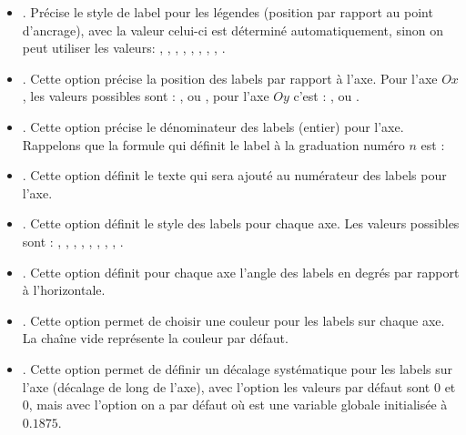 \begin{itemize}
\begin{itemize}
            \item {}. Précise le style de label pour les légendes (position par rapport au point d'ancrage), avec la valeur  celui-ci est déterminé automatiquement, sinon on peut utiliser les valeurs: , , , , , , , , .
            
            \item {}. Cette option précise la position des labels par rapport à l'axe. Pour l'axe $Ox$, les valeurs possibles sont : ,  ou , pour l'axe $Oy$ c'est :  ,  ou .
            
            \item {}. Cette option précise le dénominateur des labels (entier) pour l'axe. Rappelons que la formule qui définit le label à la graduation numéro $n$ est : 
            
            \item {}. Cette option définit le texte qui sera ajouté au numérateur des labels pour l'axe.
            
            \item {}. Cette option définit le style des labels pour chaque axe. Les valeurs possibles sont : , , , , , , , , .
            
            \item {}. Cette option définit pour chaque axe l'angle des labels en degrés par rapport à l'horizontale.
            
            \item {}. Cette option permet de choisir une couleur pour les labels sur chaque axe. La chaîne vide représente la couleur par défaut.
            
            \item {}. Cette option permet de définir un décalage systématique pour les labels sur l'axe (décalage de long de l'axe), avec l'option  les valeurs par défaut sont $0$ et $0$, mais avec l'option  on a par défaut  où  est une variable globale initialisée à $0.1875$.
            

\end{itemize}
\end{itemize}

